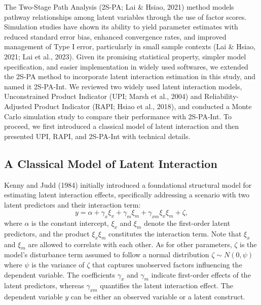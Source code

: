 \documentclass[
  man]{apa6}
\begin{document}
The Two-Stage Path Analysis (2S-PA; Lai \& Hsiao, 2021) method models pathway relationships among latent variables through the use of factor scores. Simulation studies have shown its ability to yield parameter estimates with reduced standard error bias, enhanced convergence rates, and improved management of Type I error, particularly in small sample contexts (Lai \& Hsiao, 2021; Lai et al., 2023). Given its promising statistical property, simpler model specification, and easier implementation in widely used softwares, we extended the 2S-PA method to incorporate latent interaction estimation in this study, and named it 2S-PA-Int. We reviewed two widely used latent interaction models, Unconstrained Product Indicator (UPI; Marsh et al., 2004) and Reliability-Adjusted Product Indicator (RAPI; Hsiao et al., 2018), and conducted a Monte Carlo simulation study to compare their performance with 2S-PA-Int. To proceed, we first introduced a classical model of latent interaction and then presented UPI, RAPI, and 2S-PA-Int with technical details.

\hypertarget{a-classical-model-of-latent-interaction}{%
\subsection{A Classical Model of Latent Interaction}\label{a-classical-model-of-latent-interaction}}

Kenny and Judd (1984) initially introduced a foundational structural model for estimating latent interaction effects, specifically addressing a scenario with two latent predictors and their interaction term:
\begin{equation}
y = \alpha + \gamma_{x}\xi_{x} + \gamma_{m}\xi_{m} + \gamma_{xm}\xi_{x}\xi_{m} + \zeta,
\end{equation}
where \(\alpha\) is the constant intercept, \(\xi_{x}\) and \(\xi_{m}\) denote the first-order latent predictors, and the product \(\xi_{x}\xi_{m}\) constitutes the interaction term. Note that \(\xi_{x}\) and \(\xi_{m}\) are allowed to correlate with each other. As for other parameters, \(\zeta\) is the model's disturbance term assumed to follow a normal distribution \(\zeta \sim N(0, \psi)\) where \(\psi\) is the variance of \(\zeta\) that captures unobserved factors influencing the dependent variable. The coefficients \(\gamma_{x}\) and \(\gamma_{m}\) indicate first-order effects of the latent predictors, whereas \(\gamma_{xm}\) quantifies the latent interaction effect. The dependent variable \(y\) can be either an observed variable or a latent construct.
\end{document}
